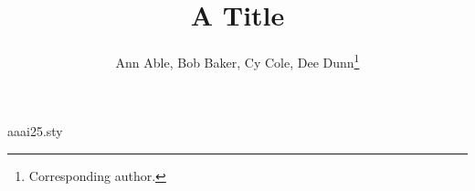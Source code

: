 \begin{filecontents*}[overwrite]{aaai25.sty}
\def\maketitle{\par\begingroup\def\thefootnote{\fnsymbol{footnote}}\twocolumn[\@maketitle]\@thanks\endgroup
  \setcounter{footnote}{0}\let\maketitle\relax\let\@maketitle\relax
  \gdef\@thanks{}\gdef\@author{}\gdef\@title{}\let\thanks\relax}
\def\@maketitle{\newcounter{eqfn}\setcounter{eqfn}{0}%
  \vbox{\let\footnote\thanks\relax\setcounter{footnote}{0}%
    \def\equalcontrib{\ifnum\value{eqfn}=0 \footnote{These authors contributed equally.}%
      \setcounter{eqfn}{\value{footnote}}\else\footnotemark[\value{eqfn}]\fi}%
    \hsize\textwidth\centering{\LARGE\bf\@title\par}\vskip 1em{\Large\bf\@author\par}}}
\end{filecontents*}
\documentclass{article}
\usepackage{aaai25}
\title{A Title}
\author{Ann Able\equalcontrib, Bob Baker\equalcontrib, Cy Cole\equalcontrib, Dee Dunn\thanks{Corresponding author.}}

\maketitle
Body.


